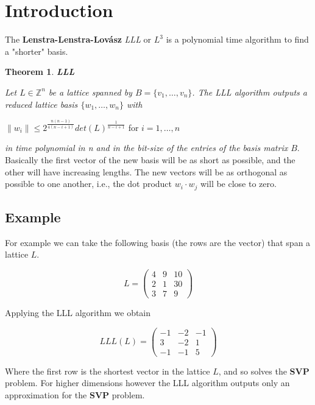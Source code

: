 \documentclass[a4paper,12pt]{report}
\newtheorem{theorem}{Theorem}[section]
\newcommand{\Z}{\mathbb{Z}}
\newcommand{\dd}{\cdot}
\begin{document}
\section{Introduction}

The \textbf{Lenstra-Lenstra-Lovász} \textit{LLL} or \textit{$L^3$} is a polynomial time algorithm to find a "shorter" basis.

\begin{theorem}
    \textbf{LLL}
\end{theorem}

\textit{Let $L \in \Z^n$ be a lattice spanned by $B = \{v_1,\ldots,v_n\}$. The LLL algorithm outputs a reduced lattice
basis $\{w_1, \ldots, w_n\}$ with}

\begin{center}
    $\lVert w_i \rVert \le 2^{\frac{n(n-1)}{4(n-i+1)}} det(L)^{\frac{1}{n-i+1}}$ for $i=1,\ldots,n$
\end{center}

\textit{in time polynomial in n and in the bit-size of the entries of the basis matrix $B$}.\\

Basically the first vector of the new basis will be as short as possible, and the other will have increasing lengths. The new vectors
will be as orthogonal as possible to one another, i.e., the dot product $w_i \dd w_j$ will be close to zero.

\subsection*{Example}

For example we can take the following basis (the rows are the vector) that span
a lattice $L$.

\[
L = 
\begin{pmatrix}
    4 & 9 & 10\\
    2 & 1 & 30\\ 
    3 & 7 & 9
\end{pmatrix}
\] 

Applying the LLL algorithm we obtain

\[
LLL(L) = 
\begin{pmatrix}
    -1 & -2 & -1\\
     3 & -2 &  1\\
    -1 & -1 &  5
\end{pmatrix}
\] 

Where the first row is the shortest vector in the lattice $L$, and so solves the \textbf{SVP} problem.
For higher dimensions however the LLL algorithm outputs only an approximation for the \textbf{SVP} problem.
\end{document}
